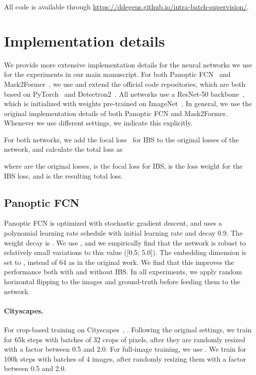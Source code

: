 \documentclass[10pt,twocolumn,letterpaper]{article}
\begin{document}
All code is available through \url{https://ddegeus.github.io/intra-batch-supervision/}.

\section{Implementation details}
\label{sec:app:impl_details}
We provide more extensive implementation details for the neural networks we use for the experiments in our main manuscript. For both Panoptic FCN~\cite{li2021panopticfcn} and Mask2Former~\cite{cheng2021mask2former}, we use and extend the official code repositories, which are both based on PyTorch~\cite{paszke2019pytorch} and Detectron2~\cite{wu2019detectron2}. All networks use a ResNet-50 backbone~\cite{he2016resnet}, which is initialized with weights pre-trained on ImageNet~\cite{deng2009imagenet}. In general, we use the original implementation details of both Panoptic FCN and Mask2Former. Whenever we use different settings, we indicate this explicitly.

For both networks, we add the focal loss~\cite{lin2017focal} for IBS to the original losses of the network, and calculate the total loss as



\noindent where  are the original losses,  is the focal loss for IBS,  is the loss weight for the IBS loss, and  is the resulting total loss.


\subsection{Panoptic FCN}
Panoptic FCN is optimized with stochastic gradient descent, and uses a polynomial learning rate schedule with initial learning rate  and decay 0.9. The weight decay is . We use , and we empirically find that the network is robust to relatively small variations to this value ([0.5; 5.0]). The embedding dimension is set to , instead of 64 as in the original work. We find that this improves the performance both with and without IBS. In all experiments, we apply random horizontal flipping to the images and ground-truth before feeding them to the network.

\paragraph{Cityscapes.}
For crop-based training on Cityscapes~\cite{cordts2016cityscapes}, . Following the original settings, we train for 65k steps with batches of 32 crops of  pixels, after they are randomly resized with a factor between 0.5 and 2.0. For full-image training, we use . We train for 100k steps with batches of 4 images, after randomly resizing them with a factor between 0.5 and 2.0.
\end{document}
